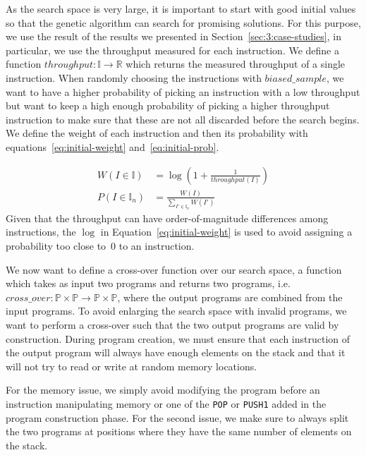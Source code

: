   As the search space is very large, it is important to start with good initial values so that the genetic algorithm can search for promising solutions. For this purpose, we use the result of the results we presented in Section~\ref{sec:3:case-studies}, in particular, we use the throughput measured for each instruction. We define a function $throughput : \mathbb{I} \rightarrow \mathbb{R}$ which returns the measured throughput of a single instruction. When randomly choosing the instructions with $biased\_sample$, we want to have a higher probability of picking an instruction with a low throughput but want to keep a high enough probability of picking a higher throughput instruction to make sure that these are not all discarded before the search begins. We define the weight of each instruction and then its probability with equations~\ref{eq:initial-weight} and~\ref{eq:initial-prob}.

  \begin{align}
    \label{eq:initial-weight}
    W(I\in \mathbb{I})   & = \log\left(1 + \frac{1}{throughput(I)}\right) \\
    \label{eq:initial-prob}
    P(I\in \mathbb{I}_n) & = \frac{W(I)}{\sum_{I'\in \mathbb{I}_n}W(I')}
  \end{align}
  Given that the throughput can have order-of-magnitude differences among instructions, the $\log$ in Equation~\ref{eq:initial-weight} is used to avoid assigning a probability too close to~$0$ to an instruction.

  We now want to define a cross-over function over our search space, a function which takes as input two programs and returns two programs, i.e. $cross\_over : \mathbb{P} \times \mathbb{P} \rightarrow \mathbb{P} \times \mathbb{P}$, where the output programs are combined from the input programs. To avoid enlarging the search space with invalid programs, we want to perform a cross-over such that the two output programs are valid by construction.
  During program creation, we must ensure that each instruction of the output program will always have enough elements on the stack and that it will not try to read or write at random memory locations.

  For the memory issue, we simply avoid modifying the program before an instruction manipulating memory or one of the \lstinline{POP} or \lstinline{PUSH1} added in the program construction phase. For the second issue, we make sure to always split the two programs at positions where they have the same number of elements on the stack.

